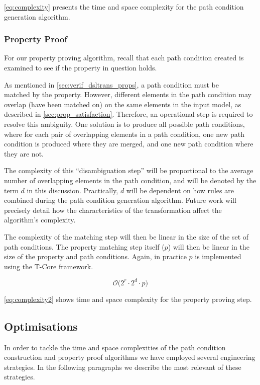 \cref{eq:complexity} presents the time and space complexity for the path condition generation algorithm.

\subsubsection{Property Proof}
\label{subsubsec:complex_prop_proof}
For our property proving algorithm, recall that each path condition created is examined to see if the property in question holds.

As mentioned in \cref{sec:verif_dsltrans_props}, a path condition must be \\matched by the property. However, different elements in the path condition may overlap (have been matched on) on the same elements in the input model, as described in \cref{sec:prop_satisfaction}.
Therefore, an operational step is required to resolve this ambiguity. One solution is to produce all possible path conditions, where for each pair of overlapping elements in a path condition, one new path condition is produced where they are merged, and one new path condition where they are not.

The complexity of this ``disambiguation step'' will be proportional to the average number of overlapping elements in the path condition, and will be denoted by the term $d$ in this discussion. Practically, $d$ will be dependent on how rules are combined during the path condition generation algorithm. Future work will precisely detail how the characteristics of the transformation affect the algorithm's complexity.

The complexity of the matching step will then be linear in the size of the set of path conditions. The property matching step itself ($p$) will then be linear in the size of the property and path conditions. Again, in practice $p$ is implemented using the T-Core framework.

\begin{equation}
\label{eq:complexity2}
\mathcal{O}\big({2^r \cdot 2^d \cdot p}\big)
\end{equation}

\cref{eq:complexity2} shows time and space complexity for the property proving step.

\subsection{Optimisations}
\label{sec:optimization}

In order to tackle the time and space complexities of the path condition
construction and property proof algorithms we have employed several engineering 
strategies. In the following paragraphs we describe the most relevant of these
strategies.

